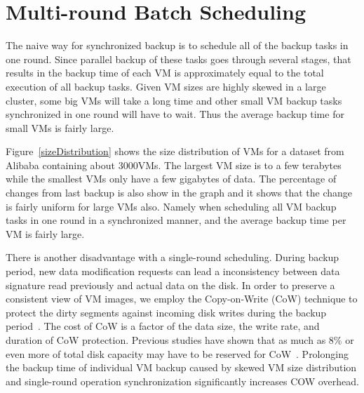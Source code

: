 \section{Multi-round Batch Scheduling}
\label{sect:scheduling}
The naive way for synchronized backup is   to schedule all of the backup tasks in one round.
Since parallel backup of these tasks goes through several stages,
that results in the backup time of each VM is approximately equal to the total execution of all backup tasks.
Given VM sizes are highly skewed in a large cluster, some big VMs will take a long time and other
small VM backup tasks synchronized in one round will have to wait.
Thus the average backup time for small VMs is fairly large. 

Figure~\ref{sizeDistribution} shows the size distribution of VMs for a dataset from Alibaba containing
about 3000VMs. The largest VM size is to a few terabytes while  the smallest VMs only have a few gigabytes of data.
The percentage of changes from last backup is also show in the graph and 
it shows that the change is fairly uniform for large VMs also. Namely when scheduling all VM backup tasks
in one round in a synchronized manner, and the average backup time per VM is fairly large.

There is another disadvantage with a single-round scheduling. 
During backup period, new data modification requests can lead a inconsistency between data signature 
read previously and actual data on the disk.
In order to preserve a consistent view of VM images, we employ
the Copy-on-Write (CoW) technique to protect the dirty segments against incoming disk writes during 
the backup period~\cite{VMare2013}. 
The cost of CoW is a factor of the data size, the write rate, and duration of CoW protection.
Previous studies have shown that as much as 8\% or even more of total disk capacity may have to be 
reserved for CoW~\cite{EMCIncrementalDataChanges}.
Prolonging the backup time of individual VM backup  caused by skewed VM size distribution
and single-round operation synchronization significantly increases COW overhead.

